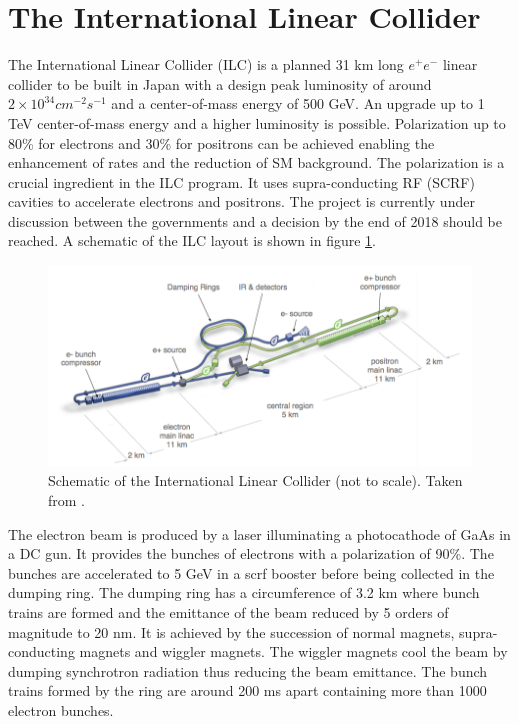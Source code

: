 \section{The International Linear Collider}
\label{sec:ILC}

The International Linear Collider (ILC) is a planned 31 km long $e^+e^-$ linear collider to be built in Japan with a design peak luminosity of around $2 \times 10^{34} cm^{-2}s^{-1}$ and a center-of-mass energy of 500 GeV. An upgrade up to 1 TeV center-of-mass energy and a higher luminosity is possible. Polarization up to 80\% for electrons and 30\% for positrons can be achieved enabling the enhancement of rates and the reduction of SM background. The polarization is a crucial ingredient in the ILC program. It uses supra-conducting RF (SCRF) cavities to accelerate electrons and positrons. The project is currently under discussion between the governments and a decision by the end of 2018 should be reached. A schematic of the ILC layout is shown in figure \ref{fig:ILC_schematic}.

\begin{figure}[htbp!]
  \centering
  \includegraphics[width=0.7\linewidth]{chap2/fig/ILC_schematic.png}
  \caption{Schematic of the International Linear Collider (not to scale). Taken from \cite{ILC_TDR_Vol1}.} \label{fig:ILC_schematic}
\end{figure}

The electron beam is produced by a laser illuminating a photocathode of GaAs in a DC gun. It provides the bunches of electrons with a polarization of 90\%. The bunches are accelerated to 5 GeV in a \acrshort{scrf} booster before being collected in the dumping ring. The dumping ring has a circumference of 3.2 km where bunch trains are formed and the emittance of the beam reduced by 5 orders of magnitude to 20 nm. It is achieved by the succession of normal magnets, supra-conducting magnets and wiggler magnets. The wiggler magnets cool the beam by dumping synchrotron radiation thus reducing the beam emittance. The bunch trains formed by the ring are around 200 ms apart containing more than 1000 electron bunches.


